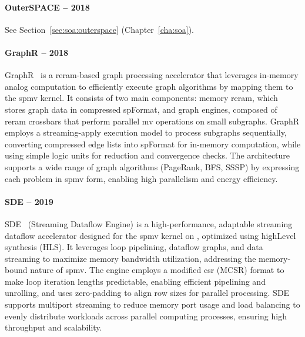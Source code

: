 \paragraph{OuterSPACE -- 2018}

See Section~\ref{sec:soa:outerspace} (Chapter~\ref{cha:soa}).

\paragraph{GraphR -- 2018}

GraphR~\cite{Song2018_GraphR} is a \acrshort{reram}-based graph processing accelerator that leverages in-memory analog computation to efficiently execute graph algorithms by mapping them to the \acrshort{spmv} kernel.
It consists of two main components: memory \acrshort{reram}, which stores graph data in compressed \gls{spFormat}, and graph engines, composed of \acrshort{reram} crossbars that perform parallel \acrfull{mv} operations on small subgraphs.
GraphR employs a streaming-apply execution model to process subgraphs sequentially, converting compressed edge lists into \gls{spFormat} for in-memory computation, while using simple logic units for \gls{reduction} and convergence checks.
The architecture supports a wide range of graph algorithms (\eg PageRank, BFS, SSSP) by expressing each problem in \acrshort{spmv} form, enabling high parallelism and energy efficiency.

\paragraph{SDE -- 2019}

SDE~\cite{Hosseinabady2019_SDE} (Streaming Dataflow Engine) is a high-performance, adaptable streaming dataflow accelerator designed for the \acrshort{spmv} kernel on , optimized using \gls{highLevel} synthesis (HLS).
It leverages loop pipelining, dataflow graphs, and data streaming to maximize memory bandwidth utilization, addressing the memory-bound nature of \acrshort{spmv}.
The engine employs a modified \acrshort{csr} (MCSR) format to make loop iteration lengths predictable, enabling efficient pipelining and unrolling, and uses zero-padding to align row sizes for parallel processing.
SDE supports multiport streaming to reduce memory port usage and load balancing to evenly distribute workloads across parallel computing processes, ensuring high throughput and scalability.

